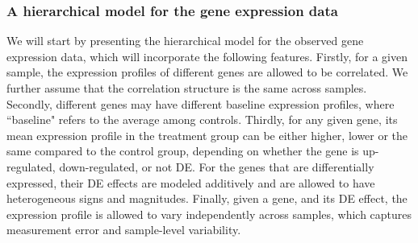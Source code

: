 \documentclass[useAMS,usenatbib, galley]{biom}
\begin{document}
	\subsubsection{A hierarchical model for the gene expression data}\label{subsection:YModel}
	We will start by presenting the hierarchical model for the observed gene expression data, which will incorporate the following features. 
	Firstly, for a given sample, the expression profiles of different genes are allowed to be correlated. We further assume that the correlation structure is the same across samples. Secondly, different genes may have different baseline expression profiles, where ``baseline" refers to the average among controls. Thirdly, for any given gene, its mean expression profile in the treatment group can be either higher, lower or the same compared to the control group, depending on whether the gene is up-regulated, down-regulated, or not DE. For the genes that are differentially expressed, their DE effects are modeled additively and are allowed to have heterogeneous signs and magnitudes. Finally, given a gene, and its DE effect, the expression profile is allowed to vary independently across samples, which captures measurement error and sample-level variability.
	
\end{document}

